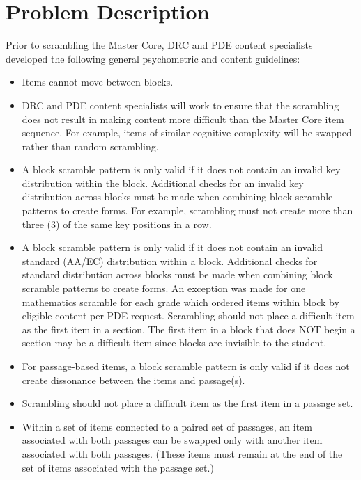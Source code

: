 \documentclass[11pt]{article}
\begin{document}
\section{Problem Description}
\par
Prior to scrambling the Master Core, DRC and PDE content specialists
developed the following general psychometric and content guidelines:
\begin{itemize}
\item Items cannot move between blocks.
\item DRC and PDE content specialists will work to ensure that the
  scrambling does not result in making content more difficult than the
  Master Core item sequence. For example, items of similar cognitive
  complexity will be swapped rather than random scrambling.
\item A block scramble pattern is only valid if it does not contain an
  invalid key distribution within the block. Additional checks for an
  invalid key distribution across blocks must be made when combining
  block scramble patterns to create forms. For example, scrambling
  must not create more than three (3) of the same key positions in a
  row.
\item A block scramble pattern is only valid if it does not contain an
  invalid standard (AA/EC) distribution within a block. Additional
  checks for standard distribution across blocks must be made when
  combining block scramble patterns to create forms.  An exception was
  made for one mathematics scramble for each grade which ordered items
  within block by eligible content per PDE request.  Scrambling should
  not place a difficult item as the first item in a section. The first
  item in a block that does NOT begin a section may be a difficult
  item since blocks are invisible to the student.
\item For passage-based items, a block scramble pattern is only valid
  if it does not create dissonance between the items and passage(s).
\item Scrambling should not place a difficult item as the first item
  in a passage set.
\item Within a set of items connected to a paired set of passages, an
  item associated with both passages can be swapped only with another
  item associated with both passages.  (These items must remain at the
  end of the set of items associated with the passage set.)

\end{itemize}
\end{document}
